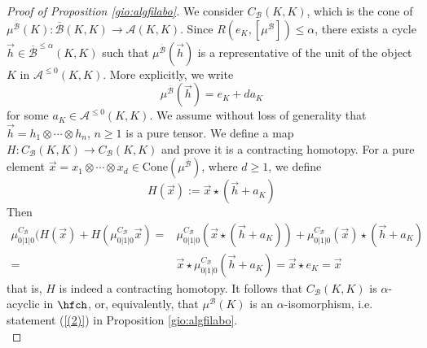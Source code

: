 \begin{proof}[Proof of Proposition \ref{gio:algfilabo}]
		We consider $C_\mathcal{B}(K,K)$, which is the cone of $\mu^{\overline{\mathcal{B}}}(K)\colon \overline{\mathcal{B}}(K,K)\to \mathcal{A}(K,K)$. Since $R(e_K,[\mu^{\overline{\mathcal{B}}}])\leq \alpha$, there exists a cycle $\vec{h}\in \overline{\mathcal{B}}^{\leq \alpha}(K,K)$ such that $\mu^{\overline{\mathcal{B}}}(\vec{h})$ is a representative of the unit of the object $K$ in $\mathcal{A}^{\leq 0}(K,K)$. More explicitly, we write $$\mu^{\overline{\mathcal{B}}}(\vec{h})= e_K + da_K$$ for some $a_K\in \mathcal{A}^{\leq 0}(K,K)$. We assume without loss of generality that $\vec{h}= h_1\otimes \cdots \otimes h_n$, $n\geq 1$ is a pure tensor.  We define a map $H\colon C_\mathcal{B}(K,K)\to C_\mathcal{B}(K,K)$ and prove it is a contracting homotopy. For a pure element $\vec{x} = x_1\otimes \cdots \otimes x_d\in \text{Cone}(\mu^{\overline{\mathcal{B}}})$, where $d\geq 1$, we define
		$$H(\vec{x}):=\vec{x}\star (\vec{h}+a_K)$$
		Then $$\begin{aligned}
			\mu^{C_\mathcal{B}}_{0|1|0}(H(\vec{x}) + H(\mu^{C_\mathcal{B}}_{0|1|0}\vec{x}) =& \mu^{C_\mathcal{B}}_{0|1|0}(\vec{x}\star (\vec{h}+a_K)) + \mu^{C_\mathcal{B}}_{0|1|0}(\vec{x})\star (\vec{h}+a_K)\\ =& \vec{x}\star\mu^{C_\mathcal{B}}_{0|1|0}(\vec{h}+a_K) = \vec{x}\star e_K = \vec{x}
		\end{aligned}$$ that is, $H$ is indeed a contracting homotopy. It follows that $C_\mathcal{B}(K,K)$ is $\alpha$-acyclic in $\hfch$, or, equivalently, that $\mu^{\mathcal{B}}(K)$ is an $\alpha$-isomorphism, i.e. statement (\ref{(2)}) in Proposition \ref{gio:algfilabo}.\\
		

\end{proof}
